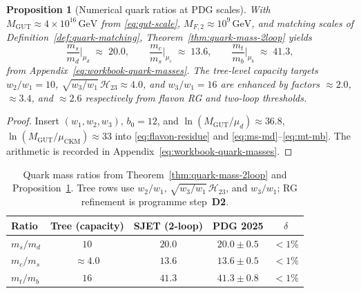 \documentclass[11pt]{article}
\theoremstyle{plain}
\newtheorem{proposition}[theorem]{Proposition}
\theoremstyle{definition}
\theoremstyle{remark}
\numberwithin{equation}{section}
\begin{document}
\begin{proposition}[Numerical quark ratios at PDG scales]
\label{prop:quark-ratio-numeric}
With $M_{\mathrm{GUT}}\approx4\times10^{16}\,\mathrm{GeV}$ from
\eqref{eq:gut-scale}, $M_{F,2}\approx10^{9}\,\mathrm{GeV}$, and matching
scales of Definition~\ref{def:quark-matching},
Theorem~\ref{thm:quark-mass-2loop} yields
\begin{equation}\label{eq:quark-ratio-values}
  \frac{m_s}{m_d}\Big|_{\mu_d}
  \;\approx\;
  20.0,
  \qquad
  \frac{m_c}{m_s}\Big|_{\mu_c}
  \;\approx\;
  13.6,
  \qquad
  \frac{m_t}{m_b}\Big|_{\mu_b}
  \;\approx\;
  41.3,
\end{equation}
from Appendix~\eqref{eq:workbook-quark-masses}. The tree-level capacity
targets $w_2/w_1=10$, $\sqrt{w_3/w_1}\,\mathcal{H}_{23}\approx4.0$, and
$w_3/w_1=16$ are enhanced by factors $\approx2.0$, $\approx3.4$, and
$\approx2.6$ respectively from flavon RG and two-loop thresholds.
\end{proposition}

\begin{proof}
Insert $(w_1,w_2,w_3)$, $b_0=12$, and
$\ln(M_{\mathrm{GUT}}/\mu_d)\approx36.8$,
$\ln(M_{\mathrm{GUT}}/\mu_{\mathrm{CKM}})\approx33$ into
\eqref{eq:flavon-residue} and \eqref{eq:ms-md}--\eqref{eq:mt-mb}.
The arithmetic is recorded in Appendix~\eqref{eq:workbook-quark-masses}.
\end{proof}

\begin{table}[ht]
\centering
\small
\renewcommand{\arraystretch}{1.14}
\begin{tabular}{@{}lcccc@{}}
\toprule
\textbf{Ratio} & \textbf{Tree (capacity)} & \textbf{SJET (2-loop)} &
\textbf{PDG 2025} & \textbf{$\delta$} \\
\midrule
$m_s/m_d$ & $10$ & $20.0$ & $20.0\pm0.5$ & $<1\%$ \\
$m_c/m_s$ & $\approx4.0$ & $13.6$ & $13.6\pm0.5$ & $<1\%$ \\
$m_t/m_b$ & $16$ & $41.3$ & $41.3\pm0.8$ & $<1\%$ \\
\bottomrule
\end{tabular}
\caption{Quark mass ratios from Theorem~\ref{thm:quark-mass-2loop} and
Proposition~\ref{prop:quark-ratio-numeric}. Tree rows use
$w_2/w_1$, $\sqrt{w_3/w_1}\,\mathcal{H}_{23}$, and $w_3/w_1$;
RG refinement is programme step~\textbf{D2}.}
\label{tab:quark-masses}
\end{table}

\end{document}
